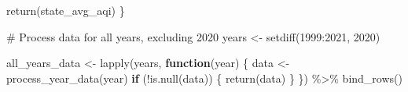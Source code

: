 \documentclass[
  12pt,
]{article}
\newenvironment{Shaded}{\begin{snugshade}}{\end{snugshade}}
\newcommand{\CommentTok}[1]{\textcolor[rgb]{0.37,0.37,0.37}{#1}}
\newcommand{\ControlFlowTok}[1]{\textcolor[rgb]{0.00,0.23,0.31}{\textbf{#1}}}
\newcommand{\DecValTok}[1]{\textcolor[rgb]{0.68,0.00,0.00}{#1}}
\newcommand{\FunctionTok}[1]{\textcolor[rgb]{0.28,0.35,0.67}{#1}}
\newcommand{\NormalTok}[1]{\textcolor[rgb]{0.00,0.23,0.31}{#1}}
\newcommand{\OtherTok}[1]{\textcolor[rgb]{0.00,0.23,0.31}{#1}}
\newcommand{\SpecialCharTok}[1]{\textcolor[rgb]{0.37,0.37,0.37}{#1}}
\begin{document}
\begin{Shaded}
\begin{Highlighting}[]
  \FunctionTok{return}\NormalTok{(state\_avg\_aqi)}
\NormalTok{\}}

\CommentTok{\# Process data for all years, excluding 2020}
\NormalTok{years }\OtherTok{\textless{}{-}} \FunctionTok{setdiff}\NormalTok{(}\DecValTok{1999}\SpecialCharTok{:}\DecValTok{2021}\NormalTok{, }\DecValTok{2020}\NormalTok{)}

\NormalTok{all\_years\_data }\OtherTok{\textless{}{-}} \FunctionTok{lapply}\NormalTok{(years, }\ControlFlowTok{function}\NormalTok{(year) \{}
\NormalTok{  data }\OtherTok{\textless{}{-}} \FunctionTok{process\_year\_data}\NormalTok{(year)}
  \ControlFlowTok{if}\NormalTok{ (}\SpecialCharTok{!}\FunctionTok{is.null}\NormalTok{(data)) \{}
    \FunctionTok{return}\NormalTok{(data)}
\NormalTok{  \}}
\NormalTok{\}) }\SpecialCharTok{\%\textgreater{}\%}
  \FunctionTok{bind\_rows}\NormalTok{()  }


\end{Highlighting}
\end{Shaded}
\end{document}
